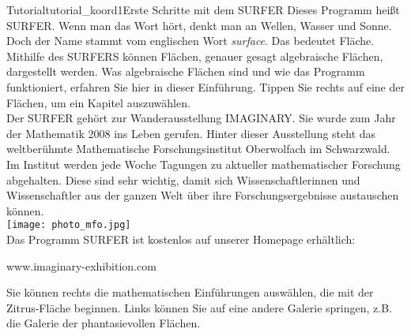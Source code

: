 \begin{surferIntroPage}{Tutorial}{tutorial_koord1}{Erste Schritte mit dem SURFER}
Dieses Programm heißt SURFER. Wenn man das Wort hört, denkt man an Wellen, Wasser und Sonne. Doch der Name stammt vom englischen Wort {\it surface}. Das bedeutet Fläche.\\
Mithilfe des SURFERS können Flächen, genauer gesagt algebraische Flächen, dargestellt werden. Was algebraische Flächen sind und wie das Programm funktioniert, erfahren Sie hier in dieser Einführung. Tippen Sie rechts auf eine der Flächen, um ein Kapitel auszuwählen. \\
Der SURFER gehört zur Wanderausstellung IMAGINARY. Sie wurde zum Jahr der Mathematik 2008 ins Leben gerufen. Hinter dieser Ausstellung steht das weltberühmte Mathematische Forschungsinstitut Oberwolfach im Schwarzwald. Im Institut werden jede Woche Tagungen zu aktueller mathematischer Forschung abgehalten. Diese sind sehr wichtig, damit sich Wissenschaftlerinnen und Wissenschaftler aus der ganzen Welt über ihre Forschungsergebnisse austauschen können. \\
\vspace{0.2cm} \hspace{3.5cm}\texttt{[image: photo\_mfo.jpg]}\\
Das Programm SURFER ist kostenlos auf unserer Homepage erhältlich: \\
\begin{centering}
www.imaginary-exhibition.com\\
\end{centering}
 \vspace{0.2cm}
Sie können rechts die mathematischen Einführungen auswählen, die mit der Zitrus-Fläche beginnen. Links können Sie auf eine andere Galerie springen, z.B. die Galerie der phantasievollen Flächen.
\end{surferIntroPage}